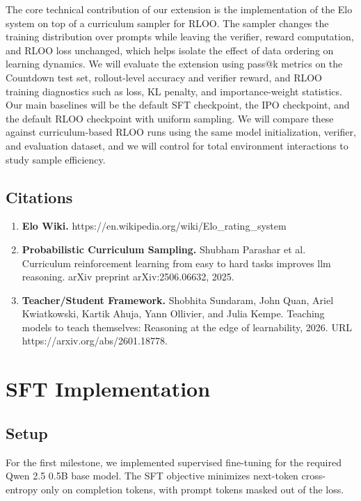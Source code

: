 \documentclass[11pt]{article}
\begin{document}
The core technical contribution of our extension is the implementation of the Elo system on top of a curriculum sampler for RLOO. The sampler changes the training distribution over prompts while leaving the verifier, reward computation, and RLOO loss unchanged, which helps isolate the effect of data ordering on learning dynamics. We will evaluate the extension using pass@k metrics on the Countdown test set, rollout-level accuracy and verifier reward, and RLOO training diagnostics such as loss, KL penalty, and importance-weight statistics. Our main baselines will be the default SFT checkpoint, the IPO checkpoint, and the default RLOO checkpoint with uniform sampling. We will compare these against curriculum-based RLOO runs using the same model initialization, verifier, and evaluation dataset, and we will control for total environment interactions to study sample efficiency.

\subsection{Citations}
\begin{enumerate}
  \item \hypertarget{elo}{}\textbf{Elo Wiki.}
  https://en.wikipedia.org/wiki/Elo\_rating\_system
  \item \hypertarget{paper:curriculum_sampling}{}\textbf{Probabilistic Curriculum Sampling.} Shubham Parashar et al. Curriculum reinforcement learning from easy to hard tasks improves
llm reasoning. arXiv preprint arXiv:2506.06632, 2025.
  \item \hypertarget{paper:t_s}{}\textbf{Teacher/Student Framework.} Shobhita Sundaram, John Quan, Ariel Kwiatkowski, Kartik Ahuja, Yann Ollivier, and Julia
Kempe. Teaching models to teach themselves: Reasoning at the edge of learnability, 2026. URL
https://arxiv.org/abs/2601.18778.
\end{enumerate}
\section{SFT Implementation}

\subsection{Setup}

For the first milestone, we implemented supervised fine-tuning for the required Qwen 2.5 0.5B base model. The SFT objective minimizes next-token cross-entropy only on completion tokens, with prompt tokens masked out of the loss.
\end{document}
